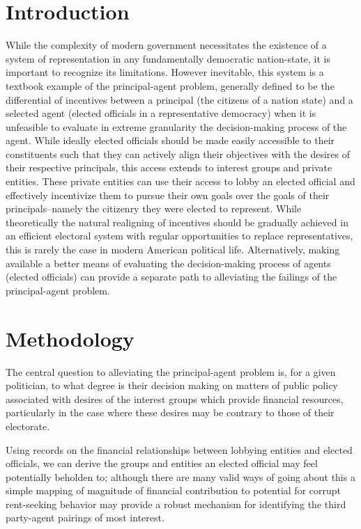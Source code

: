 \documentclass[journal]{IEEEtran}
\begin{document}
\IEEEpeerreviewmaketitle



\section{Introduction}
While the complexity of modern government necessitates the existence of a system of representation in any fundamentally democratic nation-state, it is important to recognize its limitations. However inevitable, this system is a textbook example of the principal-agent problem, generally defined to be the differential of incentives between a principal (the citizens of a nation state) and a selected agent (elected officials in a representative democracy) when it is unfeasible to evaluate in extreme granularity the decision-making process of the agent. While ideally elected officials should be made easily accessible to their constituents such that they can actively align their objectives with the desires of their respective principals, this access extends to interest groups and private entities. These private entities can use their access to lobby an elected official and effectively incentivize them to pursue their own goals over the goals of their principals--namely the citizenry they were elected to represent.
While theoretically the natural realigning of incentives should be gradually achieved in an efficient electoral system with regular opportunities to replace representatives, this is rarely the case in modern American political life. Alternatively, making available a better means of evaluating the decision-making process of agents (elected officials) can provide a separate path to alleviating the failings of the principal-agent problem.
\section{Methodology}
The central question to alleviating the principal-agent problem is, for a given politician, to what degree is their decision making on matters of public policy associated with desires of the interest groups which provide financial resources, particularly in the case where these desires may be contrary to those of their electorate. 

Using records on the financial relationships between lobbying entities and elected officials, we can derive the groups and entities an elected official may feel potentially beholden to; although there are many valid ways of going about this a simple mapping of magnitude of financial contribution to potential for corrupt rent-seeking behavior may provide a robust mechanism for identifying the third party-agent pairings of most interest.
\end{document}
